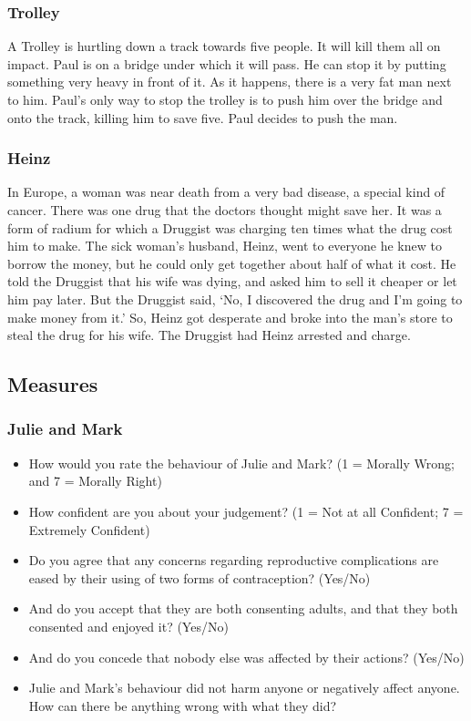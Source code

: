 \documentclass[
  american,
  man,floatsintext]{apa7}
\providecommand{\tightlist}{%
  \setlength{\itemsep}{0pt}\setlength{\parskip}{0pt}}
\begin{document}
\hypertarget{trolley}{%
\subsubsection{Trolley}\label{trolley}}

A Trolley is hurtling down a track towards five people. It will kill them all on impact. Paul is on a bridge under which it will pass. He can stop it by putting something very heavy in front of it. As it happens, there is a very fat man next to him. Paul's only way to stop the trolley is to push him over the bridge and onto the track, killing him to save five. Paul decides to push the man.

\hypertarget{heinz}{%
\subsubsection{Heinz}\label{heinz}}

In Europe, a woman was near death from a very bad disease, a special kind of cancer. There was one drug that the doctors thought might save her. It was a form of radium for which a Druggist was charging ten times what the drug cost him to make. The sick woman's husband, Heinz, went to everyone he knew to borrow the money, but he could only get together about half of what it cost. He told the Druggist that his wife was dying, and asked him to sell it cheaper or let him pay later. But the Druggist said, `No, I discovered the drug and I'm going to make money from it.' So, Heinz got desperate and broke into the man's store to steal the drug for his wife. The Druggist had Heinz arrested and charge.

\hypertarget{measures}{%
\subsection{Measures}\label{measures}}

\hypertarget{julie-and-mark-1}{%
\subsubsection{Julie and Mark}\label{julie-and-mark-1}}

\begin{itemize}
\tightlist
\item
  How would you rate the behaviour of Julie and Mark? (1 = Morally Wrong; and 7 = Morally Right)
\item
  How confident are you about your judgement? (1 = Not at all Confident; 7 = Extremely Confident)
\item
  Do you agree that any concerns regarding reproductive complications are eased by their using of two forms of contraception? (Yes/No)
\item
  And do you accept that they are both consenting adults, and that they both consented and enjoyed it? (Yes/No)
\item
  And do you concede that nobody else was affected by their actions? (Yes/No)
\item
  Julie and Mark's behaviour did not harm anyone or negatively affect anyone. How can there be anything wrong with what they did?
\end{itemize}
\end{document}
